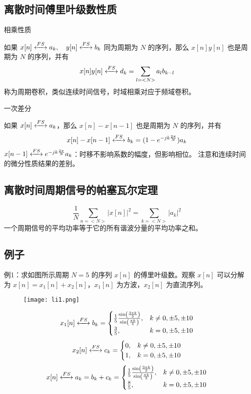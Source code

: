 \documentclass[UTF8]{report}
\theoremstyle{MyLineTheoremStyle} %
\theoremstyle{MyBlockTheoremStyle} %
\theoremstyle{MySubsubsectionStyle} %
\begin{document}
\subsection{离散时间傅里叶级数性质}
相乘性质\par
如果 $x[n] \xleftrightarrow{FS} a_k, \quad y[n] \xleftrightarrow{FS} b_k$ 同为周期为 $N$ 的序列，那么 $x[n] y[n]$ 也是周期为 $N$ 的序列，并有
\[
x[n] y[n] \xleftrightarrow{FS} d_k = \sum_{l=<N>} a_l b_{k-l}
\]
称为周期卷积，类似连续时间信号，时域相乘对应于频域卷积。\par

一次差分\par
如果 $x[n] \xleftrightarrow{FS} a_k$，那么 $x[n] - x[n-1]$ 也是周期为 $N$ 的序列，并有
\[
x[n] - x[n-1] \xleftrightarrow{FS} b_k = (1 - e^{-jk \frac{2\pi}{N}}) a_k
\]
$x[n-1] \xleftrightarrow{FS} e^{-jk \frac{2\pi}{N}} a_k$：时移不影响系数的幅度，但影响相位。
注意和连续时间的微分性质结果的差别。

\subsection{离散时间周期信号的帕塞瓦尔定理}
\[
\frac{1}{N} \sum_{n=<N>} |x[n]|^2 = \sum_{k=<N>} |a_k|^2
\]
一个周期信号的平均功率等于它的所有谐波分量的平均功率之和。

\subsection{例子}
例1：求如图所示周期 $N = 5$ 的序列 $x[n]$ 的傅里叶级数。观察 $x[n]$ 可以分解为 $x[n] = x_1[n] + x_2[n]$，$x_1[n]$ 为方波，$x_2[n]$ 为直流序列。
\begin{figure}[h]
    \centering
    \texttt{[image: li1.png]} %
\end{figure}

\[
x_1[n] \xleftrightarrow{FS} b_k = \begin{cases}
\frac{1}{5} \frac{\sin \left( \frac{3\pi k}{5} \right)}{\sin \left( \frac{\pi k}{5} \right)}, & k \neq 0, \pm 5, \pm 10 \\
\frac{3}{5}, & k = 0, \pm 5, \pm 10
\end{cases}
\]
\[
x_2[n] \xleftrightarrow{FS} c_k = \begin{cases}
0, & k \neq 0, \pm 5, \pm 10 \\
1, & k = 0, \pm 5, \pm 10
\end{cases}
\]
\[
x[n] \xleftrightarrow{FS} a_k = b_k + c_k = \begin{cases}
\frac{1}{5} \frac{\sin \left( \frac{3\pi k}{5} \right)}{\sin \left( \frac{\pi k}{5} \right)}, & k \neq 0, \pm 5, \pm 10 \\
\frac{8}{5}, & k = 0, \pm 5, \pm 10
\end{cases}
\]
\end{document}
